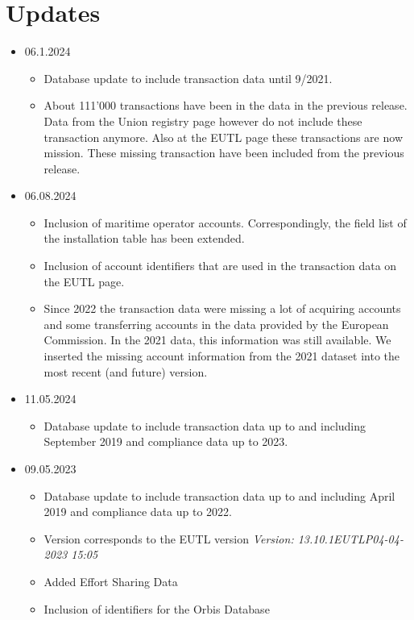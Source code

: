 \documentclass[authoryear]{elsarticle}
\begin{document}
\section*{Updates}
\begin{itemize}
	\item 06.1.2024
	\begin{itemize}
		\item Database update to include transaction data until 9/2021.
		\item About 111'000 transactions have been in the data in the previous release. Data from the Union registry page however do not include these transaction anymore. Also at the EUTL page these transactions are now mission. These missing transaction have been included from the previous release.
	\end{itemize}	
	\item 06.08.2024
	\begin{itemize}
		\item Inclusion of maritime operator accounts. Correspondingly, the field list of the installation table has been extended.
		\item Inclusion of account identifiers that are used in the transaction data on the EUTL page.
		\item Since 2022 the transaction data were missing a lot of acquiring accounts and some transferring accounts in the data provided by the European Commission. In the 2021 data, this information was still available. We inserted the missing account information from the 2021 dataset into the most recent (and future) version.
	\end{itemize}
	\item 11.05.2024
	\begin{itemize}
		\item Database update to include transaction data up to and including September 2019 and compliance data up to 2023.
	\end{itemize}
	\item 09.05.2023
	\begin{itemize}
		\item Database update to include transaction data up to and including April 2019 and compliance data up to 2022. 
		\item Version corresponds to the EUTL version \emph{Version: 13.10.1EUTLP04-04-2023 15:05}
		\item Added Effort Sharing Data
		\item Inclusion of identifiers for the Orbis Database
	\end{itemize}		

\end{itemize}
\end{document}
